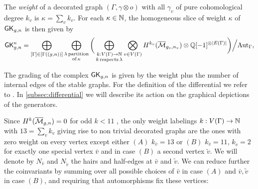The \emph{weight} of a decorated graph $(\Gamma,\gamma\otimes o)$ with all $\gamma_v$ of pure cohomological degree $k_v$ is $\kappa=\sum_v k_v$. For each $\kappa\in\mathbb{N}$, the homogeneous slice of weight $\kappa$ of $\mathsf{GK}_{g,n}$ is then given by 
\begin{equation}\label{equ:GKweight}
    \mathsf{GK}^{\kappa}_{g,n} 
    = \bigoplus_{[\Gamma]\in[\Gamma((g,n))]} \bigoplus_{\substack{\lambda\,\text{partition} \\ \text{of}\,\kappa}} \bigg( \bigoplus_{\substack{k:V(\Gamma)\rightarrow \mathbb{N} \\ k\,\text{respects}\,\lambda}}
    \bigotimes_{v\in V(\Gamma)}H^{k_v}(\overline{\mathcal{M}}_{g_v,n_v})\otimes \mathbb{Q}[-1]^{\otimes |E(\Gamma)|} \bigg) \Big/ \text{Aut}_{\Gamma},
\end{equation}

The grading of the complex $\mathsf{GK}_{g,n}$ is given by the weight plus the number of internal edges of the stable graphs. For the definition of the differential we refer to \cite{CLPW2}. In \ref{subsec:differential} we will describe its action on the graphical depictions of the generators.

Since $H^{k}(\overline{\mathcal{M}}_{g,n})=0$ for odd $k<11$ \cite{BergstromFaberPayne}, the only weight labelings $k:V(\Gamma)\rightarrow\mathbb{N}$ with $13=\sum_v k_v$ giving rise to non trivial decorated graphs are the ones with zero weight on every vertex except either $(A)$ $k_{\bar{v}}=13$ or $(B)$ $k_{\bar{v}}=11$, $k_{\tilde{v}}=2$ for exactly one special vertex $\bar{v}$ and in case $(B)$ a second vertex $\tilde{v}$. We will denote by $N_{\bar{v}}$ and $N_{\tilde{v}}$ the hairs and half-edges at $\bar{v}$ and $\tilde{v}$. We can reduce further the coinvariants by summing over all possible choices of $\bar{v}$ in case $(A)$ and $\bar{v},\tilde{v}$ in case $(B)$, and requiring that automorphisms fix these vertices:

